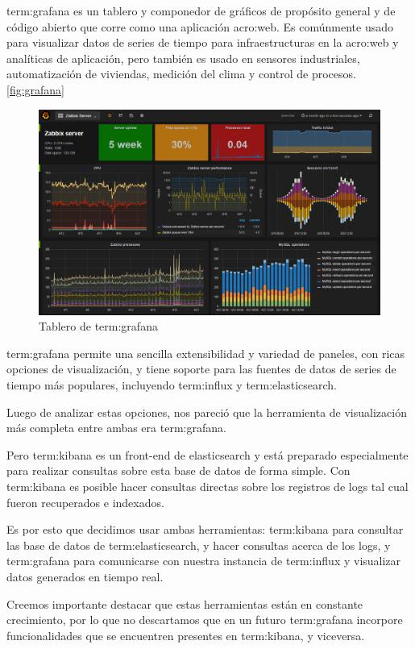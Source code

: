 \gls{term:grafana} es un tablero y componedor de gráficos de propósito general
y de código abierto que corre como una aplicación \gls{acro:web}. Es comúnmente
usado para visualizar datos de series de tiempo para infraestructuras en la
\gls{acro:web} y analíticas de aplicación, pero también es usado en sensores
industriales, automatización de viviendas, medición del clima y control de
procesos.\autoref{fig:grafana}

\begin{figure}
  \includegraphics[width=\linewidth]{src/images/05-capitulo-5/grafana.png}
  \caption{Tablero de \gls{term:grafana}}
  \label{fig:grafana}
\end{figure}

\gls{term:grafana} permite una sencilla extensibilidad y variedad de paneles,
con ricas opciones de visualización, y tiene soporte para las fuentes de datos
de series de tiempo más populares, incluyendo \gls{term:influx} y
\gls{term:elasticsearch}.

Luego de analizar estas opciones, nos pareció que la herramienta de
visualización más completa entre ambas era \gls{term:grafana}.

Pero \gls{term:kibana} es un front-end de elasticsearch y está preparado
especialmente para realizar consultas sobre esta base de datos de forma simple.
Con \gls{term:kibana} es posible hacer consultas directas sobre los registros
de logs tal cual fueron recuperados e indexados.

Es por esto que decidimos usar ambas herramientas: \gls{term:kibana} para
consultar las base de datos de \gls{term:elasticsearch}, y hacer consultas
acerca de los logs, y \gls{term:grafana} para comunicarse con nuestra instancia
de \gls{term:influx} y visualizar datos generados en tiempo real.

Creemos importante destacar que estas herramientas están en constante
crecimiento, por lo que no descartamos que en un futuro \gls{term:grafana}
incorpore funcionalidades que se encuentren presentes en \gls{term:kibana}, y
viceversa.
